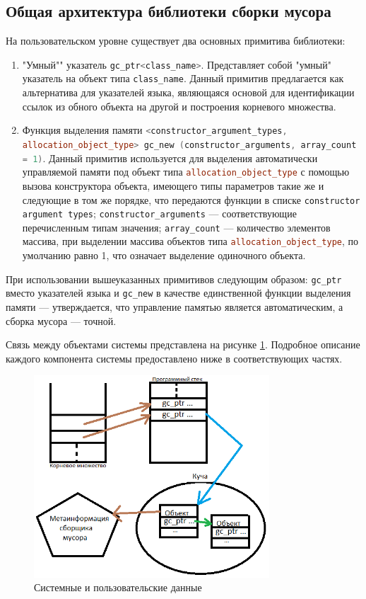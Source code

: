 \subsection{Общая архитектура библиотеки сборки мусора}
На пользовательском уровне существует два основных примитива библиотеки:
\begin{enumerate}
\item "Умный"" указатель \lstinline[language= cpp]{gc_ptr<class_name>}. Представляет собой "умный" указатель на объект типа
	\lstinline[language= cpp]{class_name}.
	Данный примитив предлагается как альтернатива для указателей языка, являющаяся основой для идентификации ссылок из
	обного объекта на другой и построения корневого множества.
\item Функция выделения памяти \sloppy\lstinline[language= cpp]{<constructor_argument_types, allocation_object_type> gc_new (constructor_arguments, array_count = 1)}. Данный примитив используется для выделения автоматически управляемой памяти под объект типа \lstinline[language= cpp]{allocation_object_type} с помощью вызова конструктора объекта, имеющего типы параметров такие же и следующие в том же порядке, что передаются функции в списке \lstinline[language= cpp]{constructor argument types};
	\lstinline[language= cpp]{constructor_arguments} --- соответствующие перечисленным типам значения;
	\lstinline[language= cpp]{array_count} --- количество элементов массива, при выделении массива объектов типа
	\lstinline[language= cpp]{allocation_object_type}, по умолчанию равно 1, что означает выделение одиночного объекта.
\end{enumerate}
При использовании вышеуказанных примитивов следующим образом: \lstinline[language= cpp]{gc_ptr} вместо указателей языка и
\lstinline[language= cpp]{gc_new} в качестве единственной функции выделения памяти --- утверждается,
что управление памятью является автоматическим, а сборка мусора --- точной.

Связь между объектами системы представлена на рисунке \ref{fig:systemArch}. Подробное описание каждого компонента системы предоставлено
ниже в соответствующих частях.
\begin{figure}[h!]
	\centering
	\includegraphics[width=250pt]{Berezun/images/systemArch.png}
	\caption{Системные и пользовательские данные}
	\label{fig:systemArch}
\end{figure}


